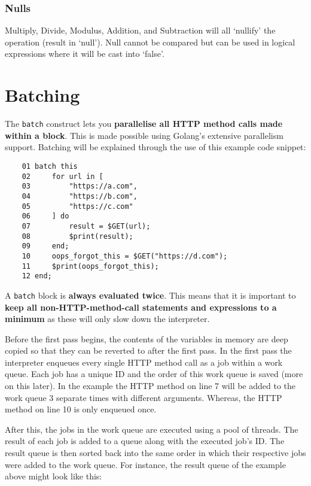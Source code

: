 \documentclass[12pt, letterpaper]{article}
\begin{document}
\subsubsection{Nulls}

Multiply, Divide, Modulus, Addition, and Subtraction will all `nullify' the operation (result in `null'). Null cannot be compared but can be used in logical expressions where it will be cast into `false'.

\section{Batching}

The \verb|batch| construct lets you \textbf{parallelise all HTTP method calls made within a block}. This is made possible using Golang's extensive parallelism support. Batching will be explained through the use of this example code snippet:

\begin{center}
    \begin{verbatim}
    01 batch this
    02     for url in [
    03         "https://a.com",
    04         "https://b.com",
    05         "https://c.com"
    06     ] do
    07         result = $GET(url);
    08         $print(result);
    09     end;
    10     oops_forgot_this = $GET("https://d.com");
    11     $print(oops_forgot_this);
    12 end;
    \end{verbatim}
\end{center}

A \verb|batch| block is \textbf{always evaluated twice}. This means that it is important to \textbf{keep all non-HTTP-method-call statements and expressions to a minimum} as these will only slow down the interpreter.

Before the first pass begins, the contents of the variables in memory are deep copied so that they can be reverted to after the first pass. In the first pass the interpreter enqueues every single HTTP method call as a job within a work queue. Each job has a unique ID and the order of this work queue is saved (more on this later). In the example the HTTP method on line 7 will be added to the work queue 3 separate times with different arguments. Whereas, the HTTP method on line 10 is only enqueued once.

After this, the jobs in the work queue are executed using a pool of threads. The result of each job is added to a queue along with the executed job's ID. The result queue is then sorted back into the same order in which their respective jobs were added to the work queue. For instance, the result queue of the example above might look like this:
\end{document}
